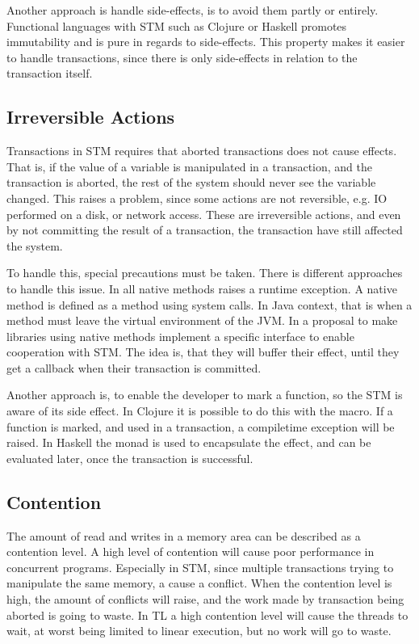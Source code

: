 Another approach is handle side-effects, is to avoid them partly or entirely. Functional languages with \ac{STM} such as Clojure or Haskell promotes immutability and is pure in regards to side-effects. This property makes it easier to handle transactions, since there is only side-effects in relation to the transaction itself. 

\subsection{Irreversible Actions}
\label{subsec:stm_irreversible_actions}
Transactions in \ac{STM} requires that aborted transactions does not cause effects. That is, if the value of a variable is manipulated in a transaction, and the transaction is aborted, the rest of the system should never see the variable changed. This raises a problem, since some actions are not reversible, e.g. \ac{IO} performed on a disk, or network access. These are irreversible actions, and even by not committing the result of a transaction, the transaction have still affected the system. 

To handle this, special precautions must be taken. There is different approaches to handle this issue. In \cite[p. 4]{harris2003language} all native methods raises a runtime exception. A native method is defined as a method using system calls. In Java context, that is when a method must leave the virtual environment of the \ac{JVM}. In \cite{harris2005exceptions} a proposal to make libraries using native methods implement a specific interface to enable cooperation with \ac{STM}. The idea is, that they will buffer their effect, until they get a callback when their transaction is committed. 

Another approach is, to enable the developer to mark a function, so the \ac{STM} is aware of its side effect. In Clojure it is possible to do this with the  macro. If a function is marked, and used in a transaction, a compiletime exception will be raised. In Haskell the  monad is used to encapsulate the effect, and can be evaluated later, once the transaction is successful.

\subsection{Contention}
The amount of read and writes in a memory area can be described as a contention level\cite[p. 2084]{herlihy2011tm}. A high level of contention will cause poor performance in concurrent programs. Especially in \ac{STM}, since multiple transactions trying to manipulate the same memory, a cause a conflict. When the contention level is high, the amount of conflicts will raise, and the work made by transaction being aborted is going to waste. In \ac{TL} a high contention level will cause the threads to wait, at worst being limited to linear execution, but no work will go to waste. 

